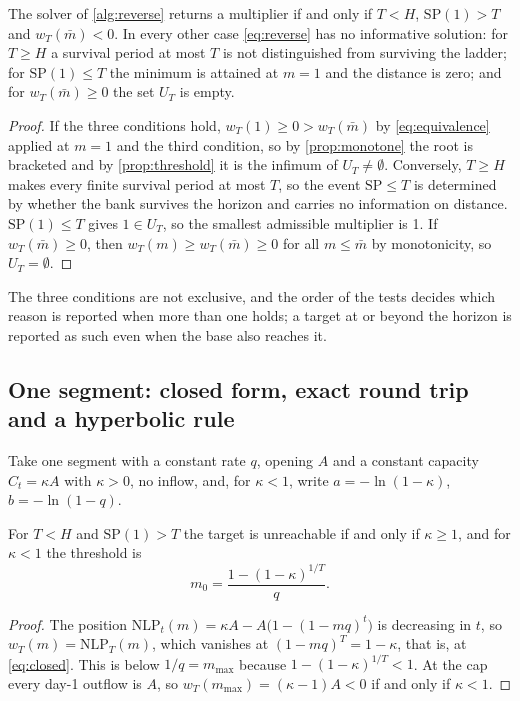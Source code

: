 \begin{proposition}[Refusal]
\label{prop:refusal}
The solver of \cref{alg:reverse} returns a multiplier if and only if $T<H$, $\mathrm{SP}(1)>T$ and $w_T(\bar m)<0$. In every other case \cref{eq:reverse} has no informative solution: for $T\ge H$ a survival period at most $T$ is not distinguished from surviving the ladder; for $\mathrm{SP}(1)\le T$ the minimum is attained at $m=1$ and the distance is zero; and for $w_T(\bar m)\ge 0$ the set $U_T$ is empty.
\end{proposition}
\begin{proof}
If the three conditions hold, $w_T(1)\ge 0>w_T(\bar m)$ by \cref{eq:equivalence} applied at $m=1$ and the third condition, so by \cref{prop:monotone} the root is bracketed and by \cref{prop:threshold} it is the infimum of $U_T\ne\emptyset$. Conversely, $T\ge H$ makes every finite survival period at most $T$, so the event $\mathrm{SP}\le T$ is determined by whether the bank survives the horizon and carries no information on distance. $\mathrm{SP}(1)\le T$ gives $1\in U_T$, so the smallest admissible multiplier is 1. If $w_T(\bar m)\ge 0$, then $w_T(m)\ge w_T(\bar m)\ge 0$ for all $m\le\bar m$ by monotonicity, so $U_T=\emptyset$.
\end{proof}

The three conditions are not exclusive, and the order of the tests decides which reason is reported when more than one holds; a target at or beyond the horizon is reported as such even when the base also reaches it.

\subsection{One segment: closed form, exact round trip and a hyperbolic rule}

Take one segment with a constant rate $q$, opening $A$ and a constant capacity $C_t=\kappa A$ with $\kappa>0$, no inflow, and, for $\kappa<1$, write $a=-\ln(1-\kappa)$, $b=-\ln(1-q)$.

\begin{proposition}
\label{prop:closed}
For $T<H$ and $\mathrm{SP}(1)>T$ the target is unreachable if and only if $\kappa\ge 1$, and for $\kappa<1$ the threshold is
\begin{equation}
m_0=\frac{1-(1-\kappa)^{1/T}}{q}.
\label{eq:closed}
\end{equation}
\end{proposition}
\begin{proof}
The position $\mathrm{NLP}_t(m)=\kappa A-A\bigl(1-(1-mq)^t\bigr)$ is decreasing in $t$, so $w_T(m)=\mathrm{NLP}_T(m)$, which vanishes at $(1-mq)^T=1-\kappa$, that is, at \cref{eq:closed}. This is below $1/q=m_{\max}$ because $1-(1-\kappa)^{1/T}<1$. At the cap every day-1 outflow is $A$, so $w_T(m_{\max})=(\kappa-1)A<0$ if and only if $\kappa<1$.
\end{proof}

